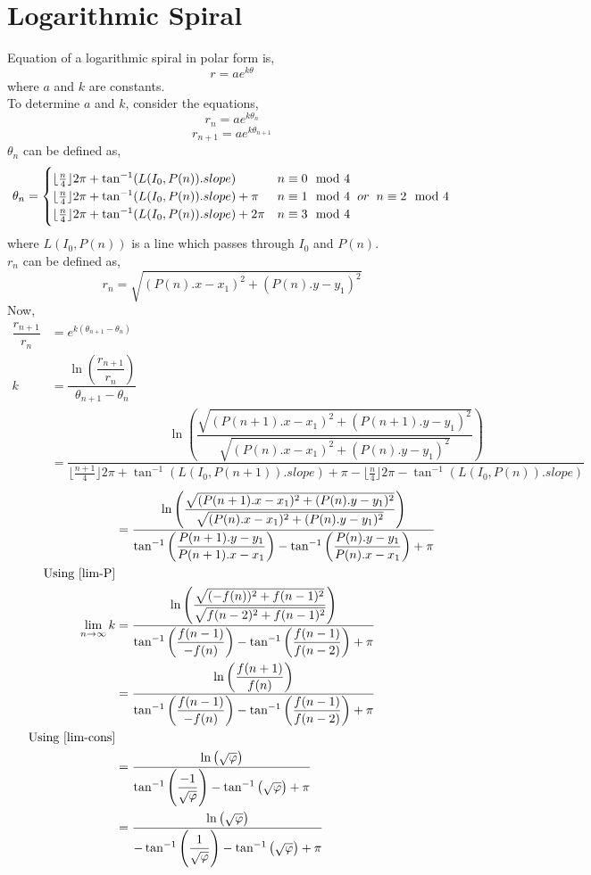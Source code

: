 \documentclass[preprint,12pt]{elsarticle}
\begin{document}
	\section{Logarithmic Spiral}
	Equation of a logarithmic spiral in polar form is,
	{\large $$r = ae^{k\theta}$$}
	where $a$ and $k$ are constants\cite{LS-wiki}.\\
	To determine $a$ and $k$, consider the equations,
	{\large$$r_n = ae^{k\theta_n}$$}
	{\large$$r_{n+1}=ae^{k\theta_{n+1}}$$}
	{\large $\theta_n$} can be defined as,
	\begin{equation*}
	\theta_n = \begin{cases}
	\lfloor\frac{n}{4}\rfloor 2\pi + \tan^{-1}({L(I_0, P(n)).slope}) & n\equiv0\mod4\\
	\lfloor\frac{n}{4}\rfloor 2\pi + \tan^{-1}({L(I_0, P(n)).slope}) + \pi & n\equiv 1 \mod4 \hspace{2mm}or\hspace{2mm} n\equiv 2\mod4\\
	\lfloor\frac{n}{4}\rfloor 2\pi + \tan^{-1}({L(I_0, P(n)).slope}) + 2\pi & n\equiv3\mod4
	\end{cases}
	\end{equation*}
	where $L(I_0, P(n))$ is a line which passes through $I_0$ and $P(n)$.\\
	{\large $r_n$} can be defined as,
	$$r_n = \sqrt{(P(n).x -x_1)^2 + (P(n).y - y_1)^2}$$
	Now,
	\begin{align*}
	\dfrac{r_{n+1}}{r_n} &= e^{k(\theta_{n+1}-\theta_n)}\\
	k &= \dfrac{\ln{\left(\dfrac{r_{n+1}}{r_n}\right)}}{\theta_{n+1}-\theta_n}\\
	&= \dfrac{\ln{\left(\dfrac{\sqrt{(P(n+1).x -x_1)^2 + (P(n+1).y - y_1)^2}}{\sqrt{(P(n).x -x_1)^2 + (P(n).y - y_1)^2}}\right)}}{\lfloor\frac{n+1}{4}\rfloor 2\pi + \tan^{-1}({L(I_0, P(n+1)).slope}) + \pi -\lfloor\frac{n}{4}\rfloor 2\pi - \tan^{-1}({L(I_0, P(n)).slope})}
	\end{align*}
	\begin{align*}
	&= \dfrac{\ln{\left(\dfrac{\sqrt{(P(n+1).x -x_1)^2 + (P(n).y - y_1)^2}}{\sqrt{(P(n).x -x_1)^2 + (P(n).y - y_1)^2}}\right)}}{\tan^{-1}\left({\dfrac{P(n+1).y - y_1}{P(n+1).x - x_1}}\right) - \tan^{-1}\left({\dfrac{P(n).y - y_1}{P(n).x - x_1}}\right)+ \pi}\\
	\text{Using \ref{lim-P}}\\
	\lim_{n \to \infty} k&= \dfrac{\ln{\left(\dfrac{\sqrt{(-f(n))^2 + f(n-1)^2}}{\sqrt{f(n-2)^2 + f(n-1)^2}}\right)}}{\tan^{-1}\left({\dfrac{f(n-1)}{-f(n)}}\right) - \tan^{-1}\left({\dfrac{f(n-1)}{f(n-2)}}\right)+ \pi}\\
	&= \dfrac{\ln{\left(\dfrac{f(n+1)}{f(n)}\right)}}{\tan^{-1}\left({\dfrac{f(n-1)}{-f(n)}}\right) - \tan^{-1}\left({\dfrac{f(n-1)}{f(n-2)}}\right)+ \pi}\\
	\text{Using \ref{lim-cons}}\\
	&= \dfrac{\ln{\left(\sqrt{\varphi}\right)}}
	{\tan^{-1}\left({\dfrac{-1}{\sqrt{\varphi}}}\right) - \tan^{-1}\left({\sqrt{\varphi}}\right)+ \pi}\\
	&= \dfrac{\ln{\left(\sqrt{\varphi}\right)}}
	{-\tan^{-1}\left({\dfrac{1}{\sqrt{\varphi}}}\right) - \tan^{-1}\left({\sqrt{\varphi}}\right)+ \pi}
	\end{align*}
\end{document}
